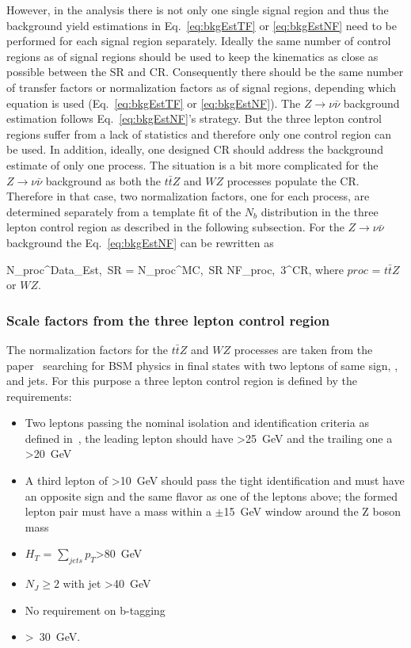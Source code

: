 However, in the analysis there is not only one single signal region and thus the background yield estimations in Eq.~\ref{eq:bkgEstTF} or \ref{eq:bkgEstNF} need to be performed for each signal region separately. Ideally the same number of control regions as of signal regions should be used to keep the kinematics as close as possible between the SR and CR. Consequently there should be the same number of  transfer factors or normalization factors as of signal regions, depending which equation is used (Eq.~\ref{eq:bkgEstTF} or \ref{eq:bkgEstNF}).  The  $Z \to \nu \bar{\nu}$ background  estimation follows Eq.~\ref{eq:bkgEstNF}'s  strategy. But the three lepton control regions suffer from a lack of statistics and therefore only one control region can be used. In addition, ideally, one designed  CR should address the background estimate of only one process. The situation is a bit more complicated for the $Z \to \nu \bar{\nu}$ background as both the  $t\bar{t}Z$ and $WZ$ processes populate the CR.  Therefore in that case, two normalization factors, one for each process, are determined separately  from a template fit of the $N_{b}$ distribution in the three lepton control region as described in the following subsection. For the $Z \to \nu \bar{\nu}$ background the Eq.~\ref{eq:bkgEstNF} can be rewritten as

{
N_{proc}^{Data_{Est},~SR}  = N_{proc}^{MC,~SR} \times NF_{proc,~3\ell}^{CR},
}
where $proc$ = $t\bar{t}Z$ or $WZ$.


\subsubsection{Scale factors from the three lepton control region}

The normalization factors for the $t\bar{t}Z$ and  $WZ$ processes are taken from the  paper~\cite{Sirunyan:2017uyt} searching for BSM physics in final states with two leptons of same sign, \MET, and jets. For this purpose a three lepton control region is defined by the requirements:
\begin{itemize}
\item Two leptons passing the nominal isolation and identification criteria as defined in~\cite{Sirunyan:2017uyt}, the leading lepton should have \pt>25~GeV and the trailing one a \pt>20~GeV
\item A third lepton of \pt>10~GeV should pass the tight identification and must have an opposite sign and the same flavor as one of the leptons above; the formed lepton pair must have a mass within a $\pm$15~GeV window around the Z boson mass
\item $H_{T}$ = $\displaystyle\sum_{jets} p_{T}$>80~GeV
\item $N_{J} \geq 2$ with jet \pt>40~GeV
\item No requirement on b-tagging
\item \MET>~30~GeV.
\end{itemize}

